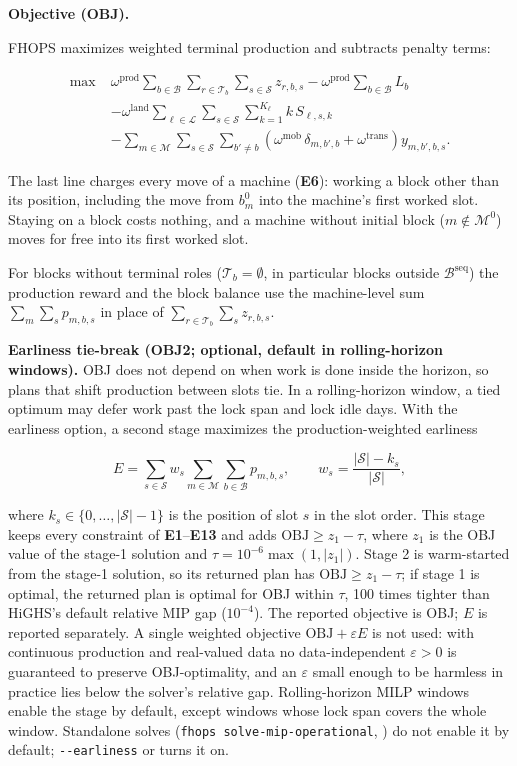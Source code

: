 \textbf{Objective (OBJ).}

FHOPS maximizes weighted terminal production and subtracts penalty
terms:

\[
\begin{aligned}
\max\; &\omega^{\text{prod}}\!\sum_{b\in\mathcal{B}}\sum_{r\in\mathcal{T}_b}\sum_{s\in\mathcal{S}} z_{r,b,s}
- \omega^{\text{prod}}\!\sum_{b\in\mathcal{B}} L_b \\
&- \omega^{\text{land}}\!\sum_{\ell\in\mathcal{L}}\sum_{s\in\mathcal{S}}\sum_{k=1}^{K_{\ell}} k\, S_{\ell,s,k} \\
&- \sum_{m\in\mathcal{M}}\sum_{s\in\mathcal{S}}\sum_{b'\ne b}
\left(\omega^{\text{mob}}\,\delta_{m,b',b} + \omega^{\text{trans}}\right) y_{m,b',b,s}.
\end{aligned}
\]

The last line charges every move of a machine (\textbf{E6}): working a
block other than its position, including the move from \(b^{0}_m\) into
the machine's first worked slot. Staying on a block costs nothing, and a
machine without initial block (\(m\notin\mathcal{M}^{0}\)) moves for
free into its first worked slot.

For blocks without terminal roles (\(\mathcal{T}_b=\emptyset\), in
particular blocks outside \(\mathcal{B}^{\text{seq}}\)) the production
reward and the block balance use the machine-level sum
\(\sum_{m}\sum_{s} p_{m,b,s}\) in place of
\(\sum_{r\in\mathcal{T}_b}\sum_s z_{r,b,s}\).

\textbf{Earliness tie-break (OBJ2; optional, default in rolling-horizon
windows).} OBJ does not depend on when work is done inside the horizon,
so plans that shift production between slots tie. In a rolling-horizon
window, a tied optimum may defer work past the lock span and lock idle
days. With the earliness option, a second stage maximizes the
production-weighted earliness

\[
E=\sum_{s\in\mathcal{S}} w_s \sum_{m\in\mathcal{M}}\sum_{b\in\mathcal{B}} p_{m,b,s},
\qquad w_s=\frac{|\mathcal{S}|-k_s}{|\mathcal{S}|},
\]

where \(k_s\in\{0,\dots,|\mathcal{S}|-1\}\) is the position of slot
\(s\) in the slot order. This stage keeps every constraint of
\textbf{E1}--\textbf{E13} and adds \(\text{OBJ}\ge z_1-\tau\), where
\(z_1\) is the OBJ value of the stage-1 solution and
\(\tau=10^{-6}\max(1,|z_1|)\). Stage 2 is warm-started from the stage-1
solution, so its returned plan has \(\text{OBJ}\ge z_1-\tau\); if stage
1 is optimal, the returned plan is optimal for OBJ within \(\tau\), 100
times tighter than HiGHS's default relative MIP gap (\(10^{-4}\)). The
reported objective is OBJ; \(E\) is reported separately. A single
weighted objective \(\text{OBJ}+\varepsilon E\) is not used: with
continuous production and real-valued data no data-independent
\(\varepsilon>0\) is guaranteed to preserve OBJ-optimality, and an
\(\varepsilon\) small enough to be harmless in practice lies below the
solver's relative gap. Rolling-horizon MILP windows enable the stage by
default, except windows whose lock span covers the whole window.
Standalone solves (\texttt{fhops\ solve-mip-operational},
) do not enable it by default;
\texttt{-\/-earliness} or  turns it on.

